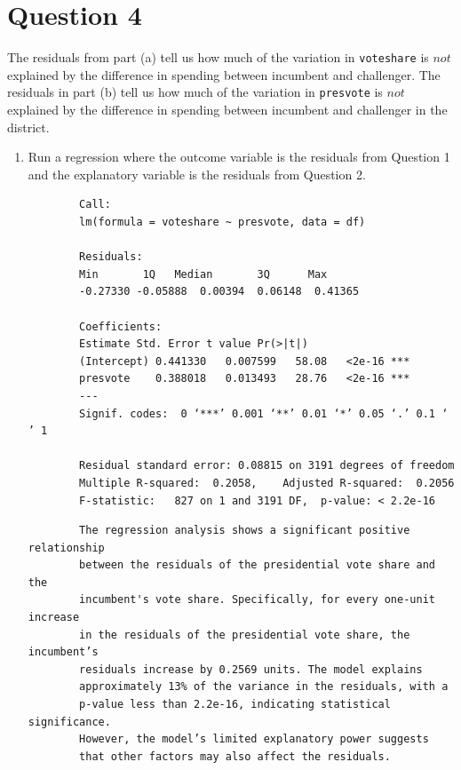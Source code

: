 \documentclass[12pt,letterpaper]{article}
\begin{document}
\section*{Question 4}
\noindent The residuals from part (a) tell us how much of the variation in \texttt{voteshare} is $not$ explained by the difference in spending between incumbent and challenger. The residuals in part (b) tell us how much of the variation in \texttt{presvote} is $not$ explained by the difference in spending between incumbent and challenger in the district.
	\begin{enumerate}
		\item Run a regression where the outcome variable is the residuals from Question 1 and the explanatory variable is the residuals from Question 2.	
		 
			\begin{verbatim}
		Call:
		lm(formula = voteshare ~ presvote, data = df)
		
		Residuals:
		Min       1Q   Median       3Q      Max 
		-0.27330 -0.05888  0.00394  0.06148  0.41365 
		
		Coefficients:
		Estimate Std. Error t value Pr(>|t|)    
		(Intercept) 0.441330   0.007599   58.08   <2e-16 ***
		presvote    0.388018   0.013493   28.76   <2e-16 ***
		---
		Signif. codes:  0 ‘***’ 0.001 ‘**’ 0.01 ‘*’ 0.05 ‘.’ 0.1 ‘ ’ 1
		
		Residual standard error: 0.08815 on 3191 degrees of freedom
		Multiple R-squared:  0.2058,	Adjusted R-squared:  0.2056 
		F-statistic:   827 on 1 and 3191 DF,  p-value: < 2.2e-16
			\end{verbatim}	
				\begin{verbatim}
		The regression analysis shows a significant positive relationship 
		between the residuals of the presidential vote share and the 
		incumbent's vote share. Specifically, for every one-unit increase 
		in the residuals of the presidential vote share, the incumbent’s 
		residuals increase by 0.2569 units. The model explains 
		approximately 13% of the variance in the residuals, with a 
		p-value less than 2.2e-16, indicating statistical significance. 
		However, the model’s limited explanatory power suggests 
		that other factors may also affect the residuals.
			\end{verbatim}	
			

\end{enumerate}
\end{document}
